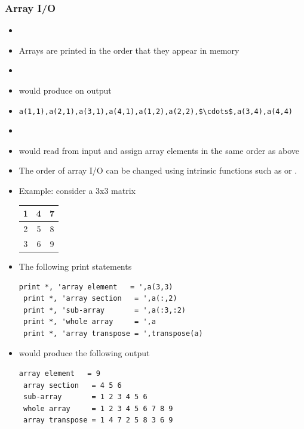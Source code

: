 \documentclass[10pt,t]{beamer}
\begin{document}
\begin{frame}
  \frametitle{\small Array I/O}
  \begin{itemize}
    \item[] 
    \item Arrays are printed in the order that they appear in memory
    \item[] 
    \item[] would produce on output
    \item[] \lstinline[mathescape]{a(1,1),a(2,1),a(3,1),a(4,1),a(1,2),a(2,2),$\cdots$,a(3,4),a(4,4)}
    \item[] 
    \item[] would read from input and assign array elements in the same order as above
    \item The order of array I/O can be changed using intrinsic functions such as  or .
      \framebreak
    \item Example: consider a 3x3 matrix
      \begin{center}
        \begin{tabular}{|c|c|c|}
          \hline
          1 & 4 & 7 \\ \hline
          2 & 5 & 8 \\ \hline
          3 & 6 & 9 \\ \hline
        \end{tabular}
      \end{center}
      \item The following print statements
        \begin{lstlisting}[language={[90]Fortran}]
 print *, 'array element   = ',a(3,3)
 print *, 'array section   = ',a(:,2)
 print *, 'sub-array       = ',a(:3,:2)
 print *, 'whole array     = ',a
 print *, 'array transpose = ',transpose(a)
        \end{lstlisting}
      \item would produce the following output
        \begin{Verbatim}[formatcom=\color{indigo}]
 array element   = 9
 array section   = 4 5 6
 sub-array       = 1 2 3 4 5 6
 whole array     = 1 2 3 4 5 6 7 8 9
 array transpose = 1 4 7 2 5 8 3 6 9
        \end{Verbatim}
    \end{itemize}
\end{frame}
\end{document}
